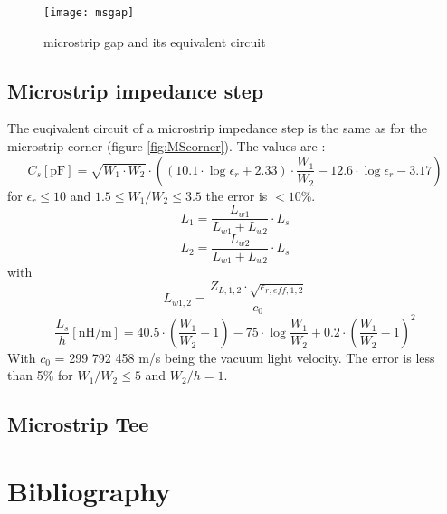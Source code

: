\documentclass[10pt]{report}
\begin{document}
\begin{figure}[ht]
\begin{center}
\texttt{[image: msgap]}
\end{center}
\caption{microstrip gap and its equivalent circuit}
\label{fig:MSgap}
\end{figure}
\FloatBarrier


\section{Microstrip impedance step}

The euqivalent circuit of a microstrip impedance step is the same
as for the microstrip corner (figure \ref{fig:MScorner}). The
values are \cite{Gupta}:
\begin{equation}
C_s [\text{pF}] = \sqrt{W_1\cdot W_2}\cdot\left( (10.1\cdot\log\epsilon_r + 2.33)\cdot
     \frac{W_1}{W_2} - 12.6\cdot\log\epsilon_r - 3.17 \right)
\end{equation}
for $\epsilon_r\le 10$ and $1.5\le W_1/W_2\le 3.5$ the error is
$<10$\%.
\begin{equation}
L_1 = \frac{L_{w1}}{L_{w1}+L_{w2}}\cdot L_s
\end{equation}
\begin{equation}
L_2 = \frac{L_{w2}}{L_{w1}+L_{w2}}\cdot L_s
\end{equation}
with
\begin{equation}
L_{w1,2} = \frac{Z_{L,1,2}\cdot\sqrt{\epsilon_{r,eff,1,2}}}{c_0}
\end{equation}
\begin{equation}
\frac{L_s}{h} [\text{nH/m}] = 40.5\cdot\left( \frac{W_1}{W_2}-1 \right)
      - 75\cdot\log\frac{W_1}{W_2} + 0.2\cdot \left( \frac{W_1}{W_2}-1 \right)^2
\end{equation}
With $c_0$ = 299 792 458 m/s being the vacuum light velocity.
The error is less than 5\% for $W_1/W_2\le 5$ and $W_2/h = 1$.


\section{Microstrip Tee}



\chapter*{Bibliography}
\def\chapter*{}%
\def\section*{}%
\renewcommand{\bibname}{}



\nocite{*}
\end{document}
